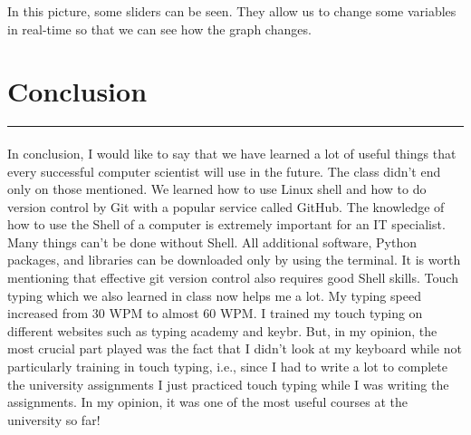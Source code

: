 \documentclass[a4paper,11pt]{article}
\newcommand{\sectitle}[1]{
    \vspace{1.5ex}
    \section{#1}
    \vspace{-3ex}
    \noindent\rule{\textwidth}{0.7pt}
    \vspace{-4ex}
}
\begin{document}
In this picture, some sliders can be seen. They allow us to change some variables in real-time so that we can see how the graph changes. 

\sectitle{Conclusion}
\paragraph{}
In conclusion, I would like to say that we have learned a lot of useful things that every successful computer scientist will use in the future. The class didn't end only on those mentioned. We learned how to use Linux shell and how to do version control by Git with a popular service called GitHub. The knowledge of how to use the Shell of a computer is extremely important for an IT specialist. Many things can't be done without Shell. All additional software, Python packages, and libraries can be downloaded only by using the terminal. It is worth mentioning that effective git version control also requires good Shell skills. Touch typing which we also learned in class now helps me a lot. My typing speed increased from 30 WPM to almost 60 WPM. I trained my touch typing on different websites such as typing academy and keybr. But, in my opinion, the most crucial part played was the fact that I didn't look at my keyboard while not particularly training in touch typing, i.e., since I had to write a lot to complete the university assignments I just practiced touch typing while I was writing the assignments. In my opinion, it was one of the most useful courses at the university so far!
\end{document}
